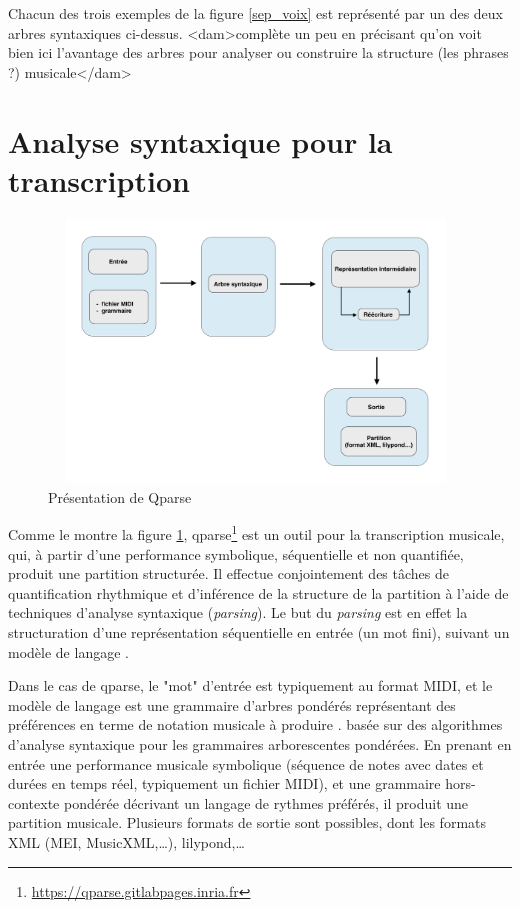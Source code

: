 Chacun des trois exemples de la figure \ref{sep_voix} est représenté par un des
deux arbres syntaxiques ci-dessus.
<dam>complète un peu en précisant qu'on voit bien ici l'avantage des arbres
pour analyser ou construire la structure (les phrases ?) musicale</dam>

\section{Analyse syntaxique pour la transcription}

\begin{figure}[h]
\centering
\includegraphics[height=70mm, width=110mm]{
z_images/3_methodes/1_Analyse_syntaxique/schema_qparse.png}
\caption{Présentation de Qparse}
\label{presentation_qparse}
\end{figure}

Comme le montre la figure \ref{presentation_qparse}, qparse\footnote{
\url{https://qparse.gitlabpages.inria.fr}} est un outil pour la transcription
musicale, qui, à partir d'une performance symbolique, séquentielle et non
quantifiée, produit une partition structurée. Il effectue conjointement des
tâches de quantification rhythmique et d'inférence de la structure de la
partition à l'aide de techniques d’analyse syntaxique (\textit{parsing}). Le
but du \textit{parsing} est en effet la structuration d'une représentation
séquentielle en entrée (un mot fini), suivant un modèle de langage
\cite{grune2007parsing}.

Dans le cas de qparse, le "mot" d'entrée est typiquement au format MIDI, et le
modèle de langage est une grammaire d'arbres pondérés représentant des
préférences en terme de notation musicale à produire \cite{droste2009handbook}.
basée sur des algorithmes d'analyse syntaxique pour les grammaires
arborescentes pondérées. En prenant en entrée une performance musicale
symbolique (séquence de notes avec dates et durées en temps réel, typiquement
un fichier MIDI), et une grammaire hors-contexte pondérée décrivant un langage
de rythmes préférés, il produit une partition musicale. Plusieurs formats de
sortie sont possibles, dont les formats XML (MEI, MusicXML,…), lilypond,…

